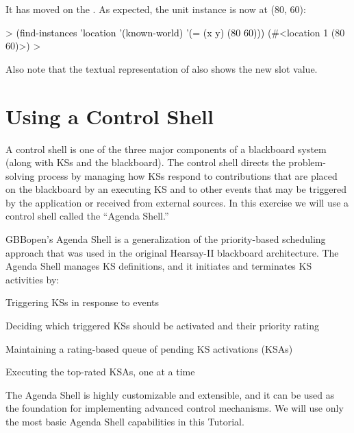 \documentclass[10pt,twoside,english,pdftex]{article}
\begin{document}
%
It has moved on the .  As expected, the 
 unit instance is now at (80, 60):
%
\begin{example}\color{darkergray}%
  > \textcolor{black}{(find-instances 'location '(known-world)
      '(= (x y) (80 60)))}
  (#<location 1 (80 60)>)
  >
\end{example}

Also note that the textual representation of  
also shows the new  slot value.


\T\markright{}%
\T\pagestyle{plain}
\T\cleardoublepage
\W{}
\T\pagestyle{fancy}
\T\thispagestyle{fancybottom}
\T\renewcommand{\headrulewidth}{0pt}
\section{Using a Control Shell}
\label{sec:control-shell}%

A control shell is one of the three major components of a blackboard system
(along with KSs and the blackboard).  The control shell directs the
problem-solving process by managing how KSs respond to contributions that are
placed on the blackboard by an executing KS and to other events that may be
triggered by the application or received from external sources.  In this
exercise we will use a control shell called the ``Agenda Shell.''

GBBopen's Agenda Shell is a generalization of the priority-based scheduling
approach that was used in the original Hearsay-II blackboard architecture.
The Agenda Shell manages KS definitions, and it initiates and terminates KS
activities by:
\begin{tightitemize}
\item Triggering KSs in response to events
\item Deciding which triggered KSs should be activated and their priority
  rating
\item Maintaining a rating-based queue of pending KS activations (KSAs)
\item Executing the top-rated KSAs, one at a time
\end{tightitemize}

The Agenda Shell is highly customizable and extensible, and it can be used as
the foundation for implementing advanced control mechanisms.  We will use only
the most basic Agenda Shell capabilities in this Tutorial.
\end{document}
